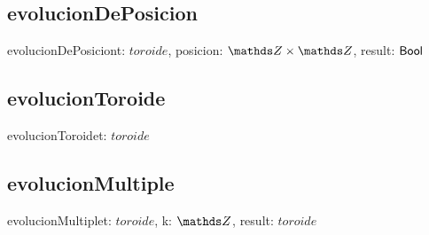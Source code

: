 \documentclass[a4paper]{article}
\begin{document}
\subsection{evolucionDePosicion}
\begin{proc}{evolucionDePosicion}{\In t: $toroide$, \In posicion: $\ent \times \ent$, \Out result: $\mathsf{Bool}$}{}
    
\end{proc}

\subsection{evolucionToroide}
\begin{proc}{evolucionToroide}{\Inout t: $toroide$}{}
\end{proc}

\subsection{evolucionMultiple}
\begin{proc}{evolucionMultiple}{\In t: $toroide$, \In k: $\ent$, \Out result: $toroide$}{}

\end{proc}
\end{document}

